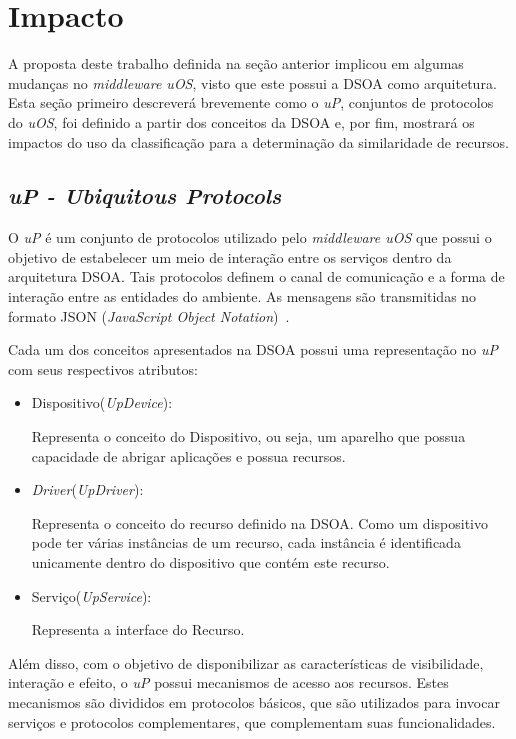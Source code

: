\section{Impacto}
\label{sec:impactoUOS}

A proposta deste trabalho definida na seção anterior implicou em algumas mudanças no \emph{middleware uOS}, visto que este possui a DSOA como arquitetura. Esta seção primeiro descreverá brevemente como o \emph{uP}, conjuntos de protocolos do \emph{uOS}, foi definido a partir dos conceitos da DSOA e, por fim, mostrará os impactos do uso da classificação para a determinação da similaridade de recursos.

\subsection{\emph{uP - Ubiquitous Protocols}}

O \emph{uP} é um conjunto de protocolos utilizado pelo \emph{middleware uOS} que possui o objetivo de estabelecer um meio de interação entre os serviços dentro da arquitetura DSOA. Tais protocolos definem o canal de comunicação e a forma de interação entre as entidades do ambiente. As mensagens são transmitidas no formato JSON (\emph{JavaScript Object Notation})~\cite{json}.

Cada um dos conceitos apresentados na DSOA possui uma representação no \emph{uP} com seus respectivos atributos:

\begin{itemize}
	\item Dispositivo(\emph{UpDevice}):

		Representa o conceito do Dispositivo, ou seja, um aparelho que possua capacidade de abrigar aplicações e possua recursos.

	\item \emph{Driver}(\emph{UpDriver}): 

		Representa o conceito do recurso definido na DSOA. Como um dispositivo pode ter várias instâncias de um recurso, cada instância é identificada unicamente dentro do dispositivo que contém este recurso.

	\item Serviço(\emph{UpService}): 

		Representa a interface do Recurso.
\end{itemize}

Além disso, com o objetivo de disponibilizar as características de visibilidade, interação e efeito, o \emph{uP} possui mecanismos de acesso aos recursos. Estes mecanismos são divididos em protocolos básicos, que são utilizados para invocar serviços e protocolos complementares, que complementam suas funcionalidades.


